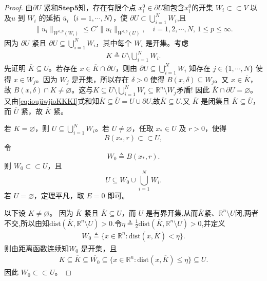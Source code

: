 \documentclass[../../main.tex]{subfiles}
\begin{document}
\begin{proof}
由$\partial U$ 紧和$\mathbf{Step}\bm{5}$知，存在有限个点 $x_{i}^{0}\in\partial U$和包含$x_i^0$的开集 $W_{i}\subset \subset V$ 以及$u$ 到 $W_{i}$ 的延拓 $\overline{u}_{i}$（$i=1,\cdots,N$），使 $\partial U\subset\bigcup_{i=1}^{N}W_{i}$,且
\begin{align}
\|\overline{u}_i\|_{W^{1,p}(W_i)}
\leqslant C'\|u_i\|_{W^{1,p}(U)},\quad i=1,2,\cdots,N,\,1\leqslant p\leqslant \infty.\label{eq::eEREFFwww1}
\end{align}
因为 \(\partial U\) 紧且 \(\partial U\subseteq\bigcup_{i=1}^N W_i\)，其中每个 \(W_i\) 是开集。考虑
\begin{align}\label{eq:ioujiwjioKKKI}
K\triangleq U\setminus\bigcup_{i=1}^N W_i.
\end{align}
先证明 \(\overline{K}\subseteq U\)。若存在 \(x\in\overline{K}\cap\partial U\)，则由 \(\partial U\subseteq\bigcup_{i=1}^N W_i\) 知存在 \(j\in\{1,\cdots,N\}\) 使得 \(x\in W_j\)。因为 \(W_j\) 是开集，所以存在 \(\delta>0\) 使得 \(B(x,\delta)\subseteq W_j\)。又 \(x\in\overline{K}\)，故 \(B(x,\delta)\cap K\neq\varnothing\)。这与$K\subseteq U\setminus\bigcup_{i=1}^N W_i\subseteq \mathbb{R}^n\setminus W_j$矛盾!
因此 \(\overline{K}\cap\partial U=\varnothing\)。又由\eqref{eq:ioujiwjioKKKI}式和知\(\overline{K}\subseteq \overline{U}=U\cup \partial U\),故$\overline{K}\subseteq U$.又 \(\overline{K}\) 是闭集且 \(\overline{K}\subseteq\overline{U}\)，而 \(\overline{U}\) 紧，故 \(\overline{K}\) 紧。

若 \(K=\varnothing\)，则 \(U\subseteq\bigcup_{i=1}^{N}W_i\)。若 \(U\neq\varnothing\)，任取 \(x_*\in U\) 及 \(r>0\)，使得
\[
B(x_*,r)\subset\subset U,
\]
令
\[
W_0\triangleq B(x_*,r).
\]
则 \(W_0\subset\subset U\)，且
\[
U\subseteq W_0\cup\bigcup_{i=1}^{N}W_i.
\]
若 \(U=\varnothing\)，定理平凡，取 \(E=0\) 即可。

以下设 \(K\neq\varnothing\)。
因为 \(\overline{K}\) 紧且 \(\overline{K}\subseteq U\)，而 \(U\) 是有界开集,从而\(\overline{K}\)紧、$\mathbb{R}^n\setminus U$闭,两者不交,所以由知$\mathrm{dist}(\overline{K},\mathbb{R}^n\setminus U)>0$.令$\eta\triangleq\frac{1}{2}\mathrm{dist}(\overline{K},\mathbb{R}^n\setminus U)>0$,并定义
\begin{align*}
W_0\triangleq\{x\in\mathbb{R}^n:\mathrm{dist}(x,\overline{K})<\eta\}.
\end{align*}
则由距离函数连续知\(W_0\) 是开集，且
\begin{align*}
K\subseteq \overline{K}\subseteq \overline{W_0}\subseteq\{x\in\mathbb{R}^n:\mathrm{dist}(x,\overline{K})\leqslant\eta\}\subseteq U.
\end{align*}
因此 \(W_0\subset\subset U\)。


\end{proof}
\end{document}
